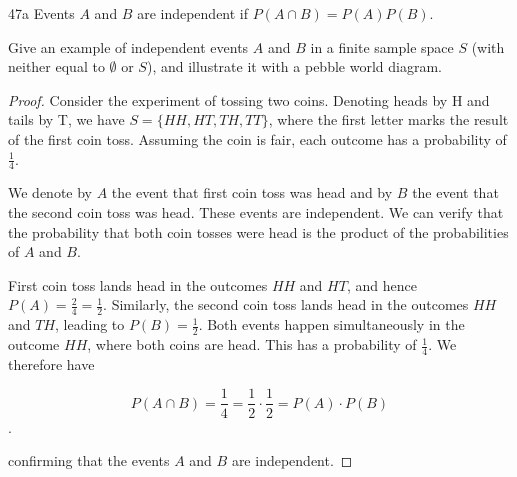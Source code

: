\begin{exercise}{47a}
    Events $A$ and $B$ are independent if $P(A \cap B) = P(A)P(B)$.

    Give an example of independent events $A$ and $B$ in a finite sample space $S$ (with neither equal to $\emptyset$ or $S$), and illustrate it with a pebble world diagram.
\end{exercise}


\begin{proof}
    Consider the experiment of tossing two coins. Denoting heads by H and tails by T, we have $S = \{HH, HT, TH, TT\}$, where the first letter marks the result of the first coin toss. Assuming the coin is fair, each outcome has a probability of $\frac{1}{4}$.

    We denote by $A$ the event that first coin toss was head and by $B$ the event that the second coin toss was head. These events are independent. We can verify that the probability that both coin tosses were head is the product of the probabilities of $A$ and $B$.

    First coin toss lands head in the outcomes $HH$ and $HT$, and hence $P(A) = \frac{2}{4} = \frac{1}{2}$. Similarly, the second coin toss lands head in the outcomes $HH$ and $TH$, leading to $P(B) = \frac{1}{2}$. Both events happen simultaneously in the outcome $HH$, where both coins are head. This has a probability of $\frac{1}{4}$. We therefore have
    
    $$P(A \cap B) = \frac{1}{4} = \frac{1}{2} \cdot \frac{1}{2} = P(A) \cdot P(B)$$.

    confirming that the events $A$ and $B$ are independent.   
\end{proof}

